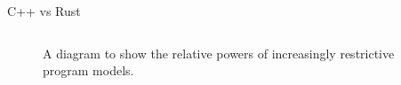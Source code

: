 \documentclass[10pt,aspectratio=169]{beamer}
\begin{document}
\begin{frame}{C++ vs Rust}
\begin{columns}[onlytextwidth]
\begin{figure}[H]
                \caption{A diagram to show the relative powers of increasingly restrictive program models.}
            \label{fig:warwick_mantevo_link}
        \end{figure}
    \end{columns}
\end{frame}

\end{document}
